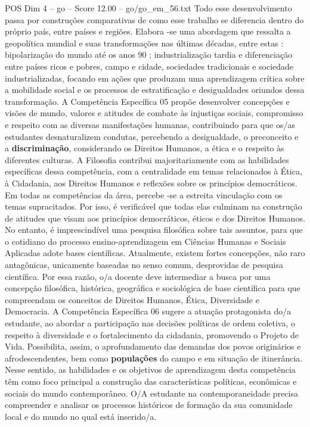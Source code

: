 \begin{textsample}{POS Dim 4 – go – Score 12.00 – go/go\_em\_56.txt}
Todo esse desenvolvimento passa por construções comparativas de como esse trabalho se diferencia dentro do próprio país, entre países e regiões.
Elabora -se uma abordagem que ressalta a geopolítica mundial e suas transformações nas últimas décadas, entre estas : bipolarização do mundo até os anos 90 ; industrialização tardia e diferenciação entre países ricos e pobres, campo e cidade, sociedades tradicionais e sociedade industrializadas, focando em ações que produzam uma aprendizagem crítica sobre a mobilidade social e os processos de estratificação e desigualdades oriundos dessa transformação.
A Competência Específica 05 propõe desenvolver concepções e visões de mundo, valores e atitudes de combate às injustiças sociais, compromisso e respeito com as diversas manifestações humanas, contribuindo para que os/as estudantes desnaturalizem condutas, percebendo a desigualdade, o preconceito e a \textbf{discriminação}, considerando os Direitos Humanos, a ética e o respeito às diferentes culturas.
A Filosofia contribui majoritariamente com as habilidades específicas dessa competência, com a centralidade em temas relacionados à Ética, à Cidadania, aos Direitos Humanos e reflexões sobre os princípios democráticos.
Em todas as competências da área, percebe -se a estreita vinculação com os temas supracitados.
Por isso, é verificável que todas elas culminam na construção de atitudes que visam aos princípios democráticos, éticos e dos Direitos Humanos.
No entanto, é imprescindível uma pesquisa filosófica sobre tais assuntos, para que o cotidiano do processo ensino-aprendizagem em Ciências Humanas e Sociais Aplicadas adote bases científicas.
Atualmente, existem fortes concepções, não raro antagônicas, unicamente baseadas no senso comum, desprovidas de pesquisa científica.
Por essa razão, o/a docente deve intermediar a busca por uma concepção filosófica, histórica, geográfica e sociológica de base científica para que compreendam os conceitos de Direitos Humanos, Ética, Diversidade e Democracia.
A Competência Específica 06 sugere a atuação protagonista do/a estudante, ao abordar a participação nas decisões políticas de ordem coletiva, o respeito à diversidade e o fortalecimento da cidadania, promovendo o Projeto de Vida.
Possibilita, assim, o aprofundamento das demandas dos povos originários e afrodescendentes, bem como \textbf{populações} do campo e em situação de itinerância.
Nesse sentido, as habilidades e os objetivos de aprendizagem desta competência têm como foco principal a construção das características políticas, econômicas e sociais do mundo contemporâneo.
O/A estudante na contemporaneidade precisa compreender e analisar os processos históricos de formação da sua comunidade local e do mundo no qual está inserido/a.

\end{textsample}
